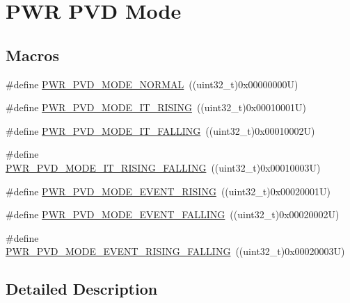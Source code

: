\hypertarget{group___p_w_r___p_v_d___mode}{}\section{P\+WR P\+VD Mode}
\label{group___p_w_r___p_v_d___mode}
\subsection*{Macros}
\begin{DoxyCompactItemize}
\item 
\#define \mbox{\hyperlink{group___p_w_r___p_v_d___mode_ga3a4bf701a36a14a4edf4dc5a28153277}{P\+W\+R\+\_\+\+P\+V\+D\+\_\+\+M\+O\+D\+E\+\_\+\+N\+O\+R\+M\+AL}}~((uint32\+\_\+t)0x00000000\+U)
\item 
\#define \mbox{\hyperlink{group___p_w_r___p_v_d___mode_ga102d7b8354419990a2a780f61cd020a6}{P\+W\+R\+\_\+\+P\+V\+D\+\_\+\+M\+O\+D\+E\+\_\+\+I\+T\+\_\+\+R\+I\+S\+I\+NG}}~((uint32\+\_\+t)0x00010001\+U)
\item 
\#define \mbox{\hyperlink{group___p_w_r___p_v_d___mode_gab600a54f3a588de836cfe4b727ab8a53}{P\+W\+R\+\_\+\+P\+V\+D\+\_\+\+M\+O\+D\+E\+\_\+\+I\+T\+\_\+\+F\+A\+L\+L\+I\+NG}}~((uint32\+\_\+t)0x00010002\+U)
\item 
\#define \mbox{\hyperlink{group___p_w_r___p_v_d___mode_gac531fbf14457e6595505354fad521b67}{P\+W\+R\+\_\+\+P\+V\+D\+\_\+\+M\+O\+D\+E\+\_\+\+I\+T\+\_\+\+R\+I\+S\+I\+N\+G\+\_\+\+F\+A\+L\+L\+I\+NG}}~((uint32\+\_\+t)0x00010003\+U)
\item 
\#define \mbox{\hyperlink{group___p_w_r___p_v_d___mode_ga1a946b01887aa886de329a92c3ab0dd4}{P\+W\+R\+\_\+\+P\+V\+D\+\_\+\+M\+O\+D\+E\+\_\+\+E\+V\+E\+N\+T\+\_\+\+R\+I\+S\+I\+NG}}~((uint32\+\_\+t)0x00020001\+U)
\item 
\#define \mbox{\hyperlink{group___p_w_r___p_v_d___mode_gaaedbe45f1a1ea6c30af6ac51abae0cae}{P\+W\+R\+\_\+\+P\+V\+D\+\_\+\+M\+O\+D\+E\+\_\+\+E\+V\+E\+N\+T\+\_\+\+F\+A\+L\+L\+I\+NG}}~((uint32\+\_\+t)0x00020002\+U)
\item 
\#define \mbox{\hyperlink{group___p_w_r___p_v_d___mode_ga7455387c8e9049f9f66b46423d4f4091}{P\+W\+R\+\_\+\+P\+V\+D\+\_\+\+M\+O\+D\+E\+\_\+\+E\+V\+E\+N\+T\+\_\+\+R\+I\+S\+I\+N\+G\+\_\+\+F\+A\+L\+L\+I\+NG}}~((uint32\+\_\+t)0x00020003\+U)
\end{DoxyCompactItemize}


\subsection{Detailed Description}


